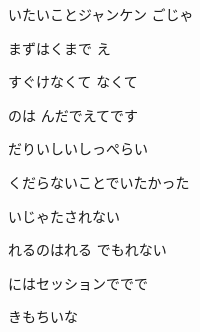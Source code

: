 \documentclass[a4paper,tate,twocolumn,12pt]{ltjtarticle}
\begin{document}
\begin{flushleft}
\vspace{2em}

\noindent\begin{minipage}{\linewidth}
いたいことジャンケン ごじゃ

まずはくまで え

すぐけなくて なくて

のは んだでえてです
\end{minipage}

\vspace{2em}

\noindent\begin{minipage}{\linewidth}
だりいしいしっぺらい

くだらないことでいたかった

いじゃたされない

れるのはれる でもれない

にはセッションででで

きもちいな
\end{minipage}

\end{flushleft}
\end{document}
